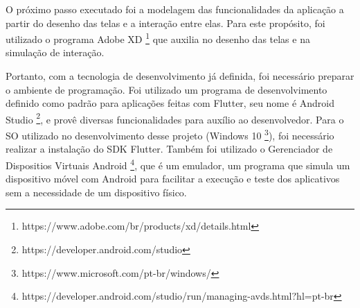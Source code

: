 O próximo passo executado foi a modelagem das funcionalidades da aplicação a partir do desenho das telas e a interação entre elas.
Para este propósito, foi utilizado o programa Adobe XD \footnote{https://www.adobe.com/br/products/xd/details.html} que auxilia no desenho das telas e na simulação de interação.

Portanto, com a tecnologia de desenvolvimento já definida, foi necessário preparar o ambiente de programação.
Foi utilizado um programa de desenvolvimento definido como padrão para aplicações feitas com Flutter, seu nome é Android Studio \footnote{https://developer.android.com/studio}, e provê diversas funcionalidades para auxílio ao desenvolvedor.
Para o SO utilizado no desenvolvimento desse projeto (Windows 10 \footnote{https://www.microsoft.com/pt-br/windows/}), foi necessário realizar a instalação do SDK Flutter.
Também foi utilizado o Gerenciador de Dispositios Virtuais Android \footnote{https://developer.android.com/studio/run/managing-avds.html?hl=pt-br}, que é um emulador, um programa que simula um dispositivo móvel com Android para facilitar a execução e teste dos aplicativos sem a necessidade de um dispositivo físico.





